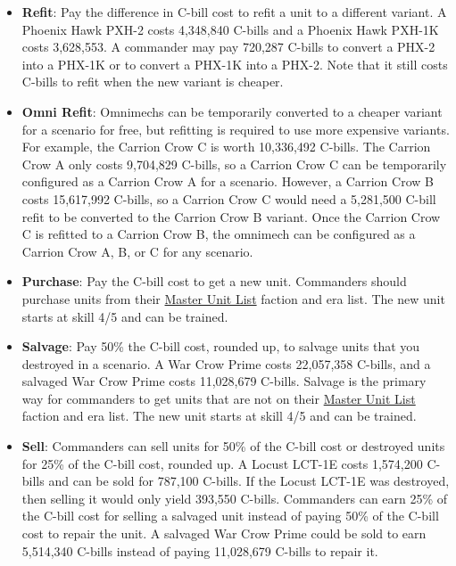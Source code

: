 \documentclass[UTF8]{article}
\begin{document}
\begin{itemize}
\item {\bf Refit}: Pay the difference in C-bill cost to refit a unit to a different variant.
A Phoenix Hawk PXH-2 costs 4,348,840 C-bills and a Phoenix Hawk PXH-1K costs 3,628,553.
A commander may pay 720,287 C-bills to convert a PHX-2 into a PHX-1K or to convert a PHX-1K into a PHX-2.
Note that it still costs C-bills to refit when the new variant is cheaper.

\item {\bf Omni Refit}: Omnimechs can be temporarily converted to a cheaper variant for a scenario for free, but refitting is required to use more expensive variants.
For example, the Carrion Crow C is worth 10,336,492 C-bills.
The Carrion Crow A only costs 9,704,829 C-bills, so a Carrion Crow C can be temporarily configured as a Carrion Crow A for a scenario.
However, a Carrion Crow B costs 15,617,992 C-bills, so a Carrion Crow C would need a 5,281,500 C-bill refit to be converted to the Carrion Crow B variant.
Once the Carrion Crow C is refitted to a Carrion Crow B, the omnimech can be configured as a Carrion Crow A, B, or C for any scenario.

\item {\bf Purchase}: Pay the C-bill cost to get a new unit.
Commanders should purchase units from their \href{http://www.masterunitlist.info}{Master Unit List} faction and era list.
The new unit starts at skill 4/5 and can be trained.

\item {\bf Salvage}: Pay 50\% the C-bill cost, rounded up, to salvage units that you destroyed in a scenario.
A War Crow Prime costs 22,057,358 C-bills, and a salvaged War Crow Prime costs 11,028,679 C-bills.
Salvage is the primary way for commanders to get units that are not on their \href{http://www.masterunitlist.info}{Master Unit List} faction and era list.
The new unit starts at skill 4/5 and can be trained.

\item {\bf Sell}: Commanders can sell units for 50\% of the C-bill cost or destroyed units for 25\% of the C-bill cost, rounded up.
A Locust LCT-1E costs 1,574,200 C-bills and can be sold for 787,100 C-bills.
If the Locust LCT-1E was destroyed, then selling it would only yield 393,550 C-bills.
Commanders can earn 25\% of the C-bill cost for selling a salvaged unit instead of paying 50\% of the C-bill cost to repair the unit.
A salvaged War Crow Prime could be sold to earn 5,514,340 C-bills instead of paying 11,028,679 C-bills to repair it.

\end{itemize}
\end{document}
